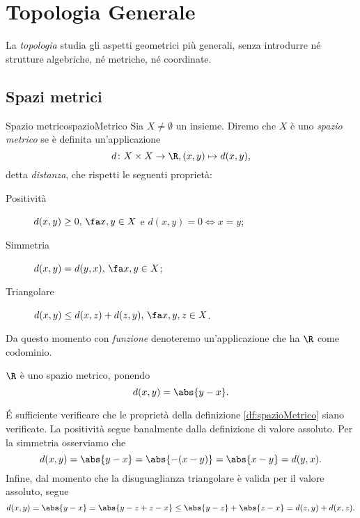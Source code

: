 %
%
\chapter{Topologia Generale}

La \emph{topologia} studia gli aspetti geometrici più generali, senza introdurre né strutture algebriche, né metriche, né coordinate.
\section{Spazi metrici}

\begin{defn}{Spazio metrico}{spazioMetrico}
    Sia $X\neq\emptyset$ un insieme.
    Diremo che $X$ è uno \emph{spazio metrico} se è definita un'applicazione
    \[
        d\colon X\times X\to\R,(x,y)\mapsto d(x,y),
    \]
    detta \emph{distanza}, che rispetti le seguenti proprietà:
    \begin{description}
        \item[Positività]$d(x,y)\ge 0,\,\fa x,y\in X$ e $d(x,y)=0\iff x=y$;
        \item[Simmetria]$d(x,y)=d(y,x),\,\fa x,y\in X$;
        \item[Triangolare]$d(x,y)\le d(x,z)+d(z,y),\,\fa x,y,z\in X$.
    \end{description}
\end{defn}

\begin{notz}
    Da questo momento con \emph{funzione} denoteremo un'applicazione che ha $\R$ come codominio.
\end{notz}

\begin{exe}
    $\R$ è uno spazio metrico, ponendo
    \[
        d(x,y)=\abs{y-x}.
    \]
\end{exe}

\begin{sol}
    \'E sufficiente verificare che le proprietà della definizione \ref{df:spazioMetrico} siano verificate.
    La positività segue banalmente dalla definizione di valore assoluto.
    Per la simmetria osserviamo che
    \[
        d(x,y)=\abs{y-x}=\abs{-(x-y)}=\abs{x-y}=d(y,x).
    \]
    Infine, dal momento che la disuguaglianza triangolare è valida per il valore assoluto, segue
    \[
        d(x,y)=\abs{y-x}=\abs{y-z+z-x}\le\abs{y-z}+\abs{z-x}=d(z,y)+d(x,z).
    \]
\end{sol}

